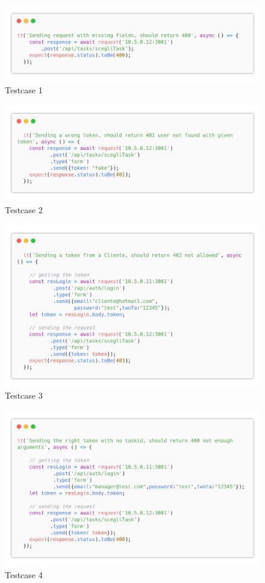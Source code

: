 \documentclass{report}
\begin{document}
\begin{figure}[H]
	\centering\includegraphics[width=1\textwidth]{images/code_scegli_task_test1.png}
	Testcase 1
\end{figure}
\begin{figure}[H]
	\centering\includegraphics[width=1\textwidth]{images/code_scegli_task_test2.png}
	Testcase 2
\end{figure}
\begin{figure}[H]
	\centering\includegraphics[width=1\textwidth]{images/code_scegli_task_test3.png}
	Testcase 3
\end{figure}
\begin{figure}[H]
	\centering\includegraphics[width=1\textwidth]{images/code_scegli_task_test4.png}
	Testcase 4
\end{figure}
\end{document}
